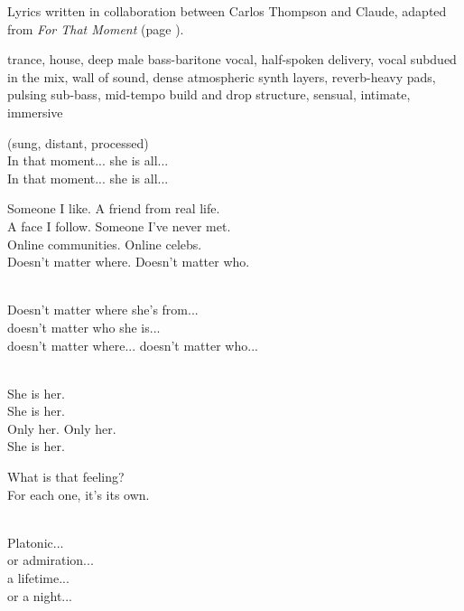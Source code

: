 
\begin{notes}
Lyrics written in collaboration between Carlos Thompson and Claude, adapted from \emph{For That Moment} (page \pageref{sec:for-that-moment}).
\end{notes}
\begin{style}
trance, house, deep male bass-baritone vocal, half-spoken delivery, vocal subdued in the mix, wall of sound, dense atmospheric synth layers, reverb-heavy pads, pulsing sub-bass, mid-tempo build and drop structure, sensual, intimate, immersive
\end{style}
\begin{lyrics}
(sung, distant, processed)\\
In that moment... she is all...\\
In that moment... she is all...

Someone I like. A friend from real life.\\
A face I follow. Someone I've never met.\\
Online communities. Online celebs.\\
Doesn't matter where. Doesn't matter who.

\\
Doesn't matter where she's from...\\
doesn't matter who she is...\\
doesn't matter where... doesn't matter who...

\\
She is her.\\
She is her.\\
Only her. Only her.\\
She is her.

What is that feeling?\\
For each one, it's its own.

\\
Platonic...\\
or admiration...\\
a lifetime...\\
or a night...


\end{lyrics}
